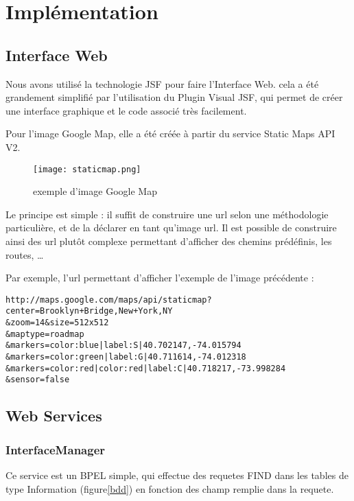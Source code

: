 \chapter{Implémentation}

\section{Interface Web}

Nous avons utilisé la technologie JSF pour faire l'Interface Web. cela a été
grandement simplifié par l'utilisation du Plugin Visual JSF, qui permet de créer
une interface graphique et le code associé très facilement.

Pour l'image Google Map, elle a été créée à partir du service Static Maps API
V2.\\

\begin{figure}[!h]
	\centering
	\texttt{[image: staticmap.png]}
	\caption{exemple d'image Google Map}
	\label{staticmap}
\end{figure}

Le principe est simple : il suffit de construire une url selon une méthodologie
particulière, et de la déclarer en tant qu'image url. Il est possible de
construire ainsi des url plutôt complexe permettant d'afficher des chemins
prédéfinis, les routes, \ldots

\clearpage

Par exemple, l'url permettant d'afficher l'exemple de l'image précédente :

\begin{verbatim}
http://maps.google.com/maps/api/staticmap?
center=Brooklyn+Bridge,New+York,NY
&zoom=14&size=512x512
&maptype=roadmap
&markers=color:blue|label:S|40.702147,-74.015794
&markers=color:green|label:G|40.711614,-74.012318
&markers=color:red|color:red|label:C|40.718217,-73.998284
&sensor=false
\end{verbatim}



\section{Web Services}

	\subsection{InterfaceManager}
	
		Ce service est un BPEL simple, qui effectue des requetes FIND dans les tables
		de type Information (figure\ref{bdd}) en fonction des champ remplie dans la
		requete.
	
